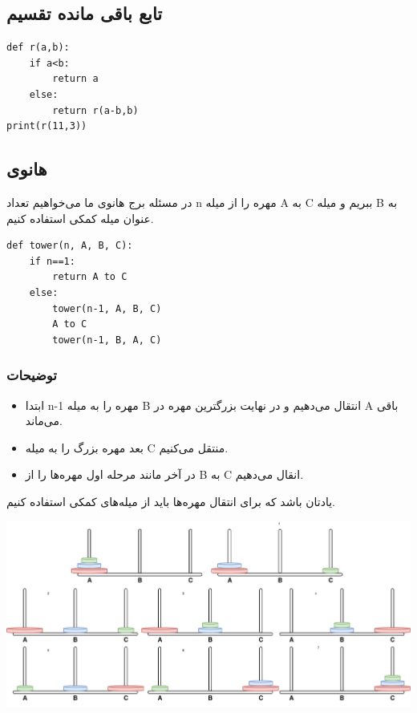 \documentclass[a4paper]{article}
\begin{document}
\subsection{تابع باقی مانده تقسیم}
\label{sec:orge7f7e6d}

\begin{verbatim}
def r(a,b):
    if a<b:
        return a
    else:
        return r(a-b,b)
print(r(11,3))
\end{verbatim}

\subsection{هانوی}
\label{sec:org4453741}
در مسئله برج هانوی ما می‌خواهیم تعداد n مهره را از میله A به C ببریم و میله B به عنوان میله کمکی استفاده کنیم.

\begin{verbatim}
def tower(n, A, B, C):
    if n==1:
        return A to C
    else:
        tower(n-1, A, B, C)
        A to C
        tower(n-1, B, A, C)
\end{verbatim}

\subsubsection{توضیحات}
\label{sec:orgcb5eaba}
\begin{itemize}
\item ابتدا n-1 مهره را به میله B انتقال می‌دهیم و در نهایت بزرگترین مهره در A باقی می‌ماند.
\item بعد مهره بزرگ را به میله C منتقل می‌کنیم.
\item در آخر مانند مرحله اول مهره‌ها را از B به C انقال می‌دهیم.
\end{itemize}

یادتان باشد که برای انتقال مهره‌ها باید از میله‌های کمکی استفاده کنیم.
\begin{center}
\includegraphics[width=.9\linewidth]{./tower.jpg}
\end{center}
\end{document}
